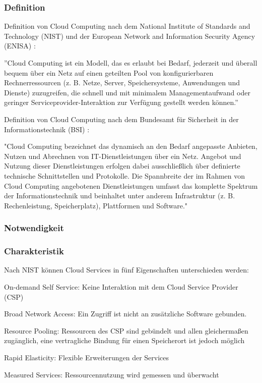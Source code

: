 \documentclass[12pt,a4paper,bibliography=totocnumbered,listof=totocnumbered]{scrartcl}
\begin{document}
\subsubsection{Definition}
Definition von Cloud Computing nach dem National Institute of Standards and Technology (NIST) und der European Network and Information Security Agency (ENISA) \cite{34}:

''Cloud Computing ist ein Modell, das es erlaubt bei Bedarf, jederzeit und überall bequem über ein Netz auf einen geteilten Pool von konfigurierbaren Rechnerressourcen (z. B. Netze, Server, Speichersysteme, Anwendungen und Dienste) zuzugreifen, die schnell und mit minimalem Managementaufwand oder geringer Serviceprovider-Interaktion zur Verfügung gestellt werden können.''

Definition von Cloud Computing nach dem Bundesamt für Sicherheit in der Informationstechnik (BSI) \cite{35}:

"Cloud Computing bezeichnet das dynamisch an den Bedarf angepasste Anbieten, Nutzen und Abrechnen von IT-Dienstleistungen über ein Netz. Angebot und Nutzung dieser Dienstleistungen erfolgen dabei ausschließlich über definierte technische Schnittstellen und Protokolle. Die Spannbreite der im Rahmen von Cloud Computing angebotenen Dienstleistungen umfasst das komplette Spektrum der Informationstechnik und beinhaltet unter anderem Infrastruktur (z. B. Rechenleistung, Speicherplatz), Plattformen und Software."

\subsubsection{Notwendigkeit}
\cite{33}

\subsubsection{Charakteristik}
Nach NIST \cite{34} können Cloud Services in fünf Eigenschaften unterschieden werden:
\begin{compactitem}
	\item On-demand Self Service: Keine Interaktion mit dem Cloud Service Provider (CSP)
	\item Broad Network Access: Ein Zugriff ist nicht an zusätzliche Software gebunden.
	\item Resource Pooling: Ressourcen des CSP sind gebündelt und allen gleichermaßen zugänglich, eine vertragliche Bindung für einen Speicherort ist jedoch möglich
	\item Rapid Elasticity: Flexible Erweiterungen der Services
	\item Measured Services: Ressourcennutzung wird gemessen und überwacht
\end{compactitem}
\end{document}
